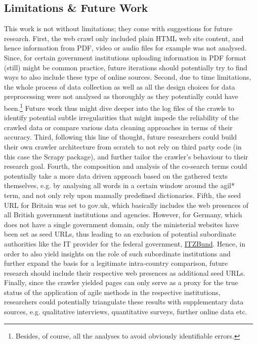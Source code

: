 \subsection{Limitations \& Future Work}\label{Limitations and Future Work}
This work is not without limitations; they come with suggestions for future research. First, the web crawl only included plain HTML web site content, and hence information from PDF, video or audio files for example was not analysed. Since, for certain government institutions uploading information in PDF format (still) might be common practice, future iterations should potentially try to find ways to also include these type of online sources. Second, due to time limitations, the whole process of data collection as well as all the design choices for data preprocessing were not analysed as thoroughly as they potentially could have been.\footnote{Besides, of course, all the analyses to avoid obviously identifiable errors.} Future work thus might dive deeper into the log files of the crawls to identify potential subtle irregularities that might impede the reliability of the crawled data or compare various data cleaning approaches in terms of their accuracy. Third, following this line of thought, future researchers could build their own crawler architecture from scratch to not rely on third party code (in this case the Scrapy package), and further tailor the crawler's behaviour to their research goal. Fourth, the composition and analysis of the co-search terms could potentially take a more data driven approach based on the gathered texts themselves, e.g. by analysing all words in a certain window around the agil* term, and not only rely upon manually predefined dictionaries. Fifth, the seed URL for Britain was set to gov.uk, which basically includes the web presences of all British government institutions and agencies. However, for Germany, which does not have a single government domain, only the ministerial websites have been set as seed URLs, thus leading to an exclusion of potential subordinate authorities like the IT provider for the federal government, \href{https://www.itzbund.de/DE/Home/home_node.html}{ITZBund}. Hence, in order to also yield insights on the role of such subordinate institutions and further expand the basis for a legitimate intra-country comparison, future research should include their respective web presences as additional seed URLs. Finally, since the crawler yielded pages can only serve as a proxy for the true status of the application of agile methods in the respective institutions, researchers could potentially triangulate these results with supplementary data sources, e.g. qualitative interviews, quantitative surveys, further online data etc. 

